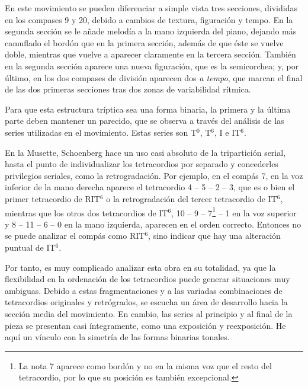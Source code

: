 		En este movimiento se pueden diferenciar a simple vista tres secciones, divididas en los compases 9 y 20, debido a cambios de textura, figuración y tempo. En la segunda sección se le añade melodía a la mano izquierda del piano, dejando más camuflado el bordón que en la primera sección, además de que éste se vuelve doble, mientras que vuelve a aparecer claramente en la tercera sección. También en la segunda sección aparece una nueva figuración, que es la semicorchea; y, por último, en los dos compases de división aparecen dos \emph{a tempo}, que marcan el final de las dos primeras secciones tras dos zonas de variabilidad rítmica. \cite{clercq}
		
		Para que esta estructura tríptica sea una forma binaria, la primera y la última parte deben mantener un parecido, que se observa a través del análisis de las series utilizadas en el movimiento. Estas series son T$^0$, T$^6$, I e IT$^6$.
		
		En la Musette, Schoenberg hace un uso casi absoluto de la tripartición serial, hasta el punto de individualizar los tetracordios por separado y concederles privilegios seriales, como la retrogradación. Por ejemplo, en el compás 7, en la voz inferior de la mano derecha aparece el tetracordio 4 -- 5 -- 2 -- 3, que es o bien el primer tetracordio de RIT$^6$ o la retrogradación del tercer tetracordio de IT$^6$, mientras que los otros dos tetracordios de IT$^6$, 10 -- 9 -- 7\footnote{La nota 7 aparece como bordón y no en la misma voz que el resto del tetracordio, por lo que su posición es también excepcional.} -- 1 en la voz superior y 8 -- 11 -- 6 -- 0 en la mano izquierda, aparecen en el orden correcto. Entonces no se puede analizar el compás como RIT$^6$, sino indicar que hay una alteración puntual de IT$^6$.
		
		Por tanto, es muy complicado analizar esta obra en su totalidad, ya que la flexibilidad en la ordenación de los tetracordios puede generar situaciones muy ambiguas. Debido a estas fragmentaciones y a las variadas combinaciones de tetracordios originales y retrógrados, se escucha un área de desarrollo hacia la sección media del movimiento. En cambio, las series al principio y al final de la pieza se presentan casi íntegramente, como una exposición y reexposición. He aquí un vínculo con la simetría de las formas binarias tonales. \cite{clercq}
		
